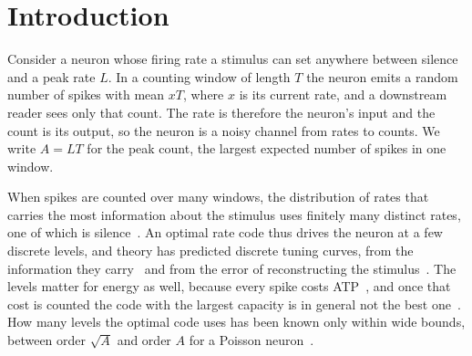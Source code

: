 \documentclass[journal]{IEEEtran}
\begin{document}
\section{Introduction}
Consider a neuron whose firing rate a stimulus can set anywhere between silence and a peak rate $L$. In a counting window of length
$T$ the neuron emits a random number of spikes with mean $xT$, where $x$ is its current rate, and a downstream reader sees only that
count. The rate is therefore the neuron's input and the count is its output, so the neuron is a noisy channel from rates to counts.
We write $A = LT$ for the peak count, the largest expected number of spikes in one window.

When spikes are counted over many windows, the distribution of rates that carries the most information about the stimulus uses
finitely many distinct rates, one of which is silence~\cite{Shamai1990,IkedaManton2009}. An optimal rate code thus drives the neuron
at a few discrete levels, and theory has predicted discrete tuning curves, from the information they carry~\cite{Nikitin2009} and
from the error of reconstructing the stimulus~\cite{Bethge2003}.
The levels matter for energy as well, because every spike costs ATP~\cite{AttwellLaughlin2001}, and once that cost is counted the code
with the largest capacity is in general not the best one~\cite{LevyBaxter1996}. How many levels the optimal code uses has been known only within wide bounds, between
order $\sqrt A$ and order $A$ for a Poisson neuron~\cite{DBS2021,BDS2024}.
\end{document}
